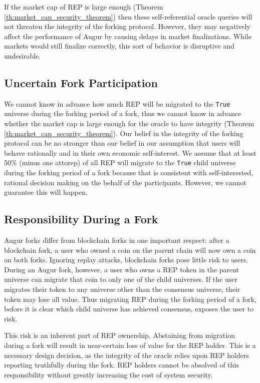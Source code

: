 \documentclass[floatfix,reprint,nofootinbib,amsmath,amssymb,epsfig,pre,floats,letterpaper,groupedaffiliation]{revtex4-1}
\theoremstyle{definition}
\theoremstyle{definition}
\begin{document}
If the market cap of REP is large enough (Theorem \ref{th:market_cap_security_theorem}) then these self-referential oracle queries will not threaten the integrity of the forking protocol.  However, they may negatively affect the performance of Augur by causing delays in market finalizations.  While markets would still finalize correctly, this sort of behavior is disruptive and undesirable.

\subsection{Uncertain Fork Participation}\label{subsection:uncertain_fork_participation}

We cannot know in advance how much REP will be migrated to the \texttt{True} universe during the forking period of a fork, thus we cannot know in advance whether the market cap is large enough for the oracle to have integrity (Theorem \ref{th:market_cap_security_theorem}).  Our belief in the integrity of the forking protocol can be no stronger than our belief in our assumption that users will behave rationally and in their own economic self-interest. We assume that at least 50\% (minus one attorep) of all REP will migrate to the \texttt{True} child universe during the forking period of a fork because that is consistent with self-interested, rational decision making on the behalf of the participants. However, we cannot guarantee this will happen.

\subsection{Responsibility During a Fork}
Augur forks differ from blockchain forks in one important respect: after a blockchain fork, a user who owned a coin on the parent chain will now own a coin on both forks.  Ignoring replay attacks, blockchain forks pose little risk to users.  During an Augur fork, however, a user who owns a REP token in the parent universe can migrate that coin to only one of the child universes.  If the user migrates their token to any universe other than the consensus universe, their token may lose all value.  Thus migrating REP during the forking period of a fork, before it is clear which child universe has achieved consensus, exposes the user to risk.

This risk is an inherent part of REP ownership. Abstaining from migration during a fork will result in near-certain loss of value for the REP holder. This is a necessary design decision, as the integrity of the oracle relies upon REP holders reporting truthfully during the fork. REP holders cannot be absolved of this responsibility without greatly increasing the cost of system security.
\end{document}
